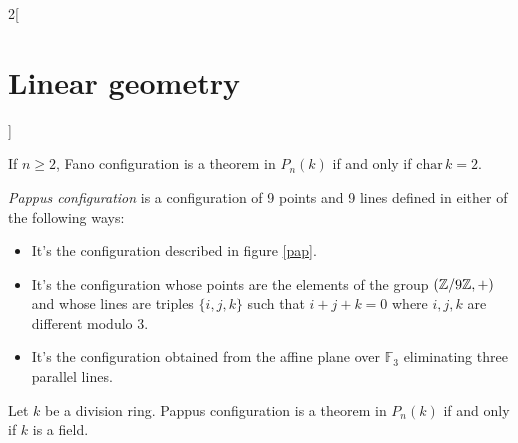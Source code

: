 \documentclass[../../../main.tex]{subfiles}
\begin{document}
\begin{multicols}{2}[\section{Linear geometry}]
\begin{definition}
\end{definition}
\begin{theorem}
If $n\geq 2$, Fano configuration is a theorem in $P_n(k)$ if and only if $\text{char}\,k=2$.
\end{theorem}
\begin{definition}
\textit{Pappus configuration} is a configuration of 9 points and 9 lines defined in either of the following ways:
\begin{itemize}
    \item It's the configuration described in figure \ref{pap}.
    \item It's the configuration whose points are the elements of the group $(\mathbb{Z} /9\mathbb{Z} ,+)$ and whose lines are triples $\{i,j,k\}$ such that $i+j+k=0$ where $i,j,k$ are different modulo 3.
    \item It's the configuration obtained from the affine plane over $\mathbb{F}_3$ eliminating three parallel lines.
\end{itemize}
\end{definition}
\begin{theorem}
Let $k$ be a division ring. Pappus configuration is a theorem in $P_n(k)$ if and only if $k$ is a field.
\end{theorem}

\end{multicols}
\end{document}
